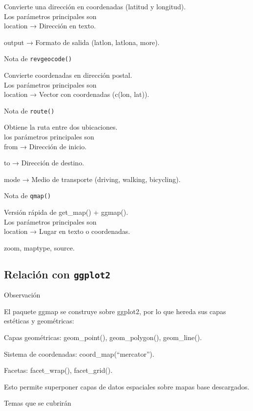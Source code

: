 \documentclass[
]{book}
\begin{document}
Convierte una dirección en coordenadas (latitud y longitud).\\
Los parámetros principales son\\

location → Dirección en texto.

output → Formato de salida (latlon, latlona, more).

{} Nota de \texttt{revgeocode()}

Convierte coordenadas en dirección postal.\\
Los parámetros principales son\\

location → Vector con coordenadas (c(lon, lat)).

{} Nota de \texttt{route()}

Obtiene la ruta entre dos ubicaciones.\\
los parámetros principales son\\

from → Dirección de inicio.

to → Dirección de destino.

mode → Medio de transporte (driving, walking, bicycling).

{} Nota de \texttt{qmap()}

Versión rápida de get\_map() + ggmap().\\
Los parámetros principales son\\

location → Lugar en texto o coordenadas.

zoom, maptype, source.

\subsection{\texorpdfstring{Relación con \texttt{ggplot2}}{Relación con ggplot2}}\label{relaciuxf3n-con-ggplot2}

{} Observación

El paquete ggmap se construye sobre ggplot2, por lo que hereda sus capas estéticas y geométricas:

Capas geométricas: geom\_point(), geom\_polygon(), geom\_line().

Sistema de coordenadas: coord\_map(``mercator'').

Facetas: facet\_wrap(), facet\_grid().

Esto permite superponer capas de datos espaciales sobre mapas base descargados.

Temas que se cubrirán
\end{document}
